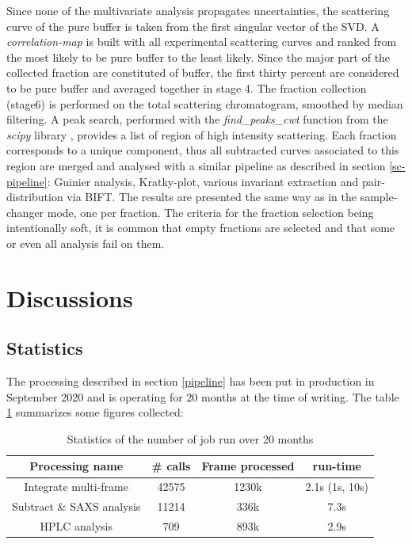 \documentclass[preprint]{iucr}              %
\begin{document}
Since none of the multivariate analysis propagates uncertainties, the scattering curve of the pure buffer is taken from the first singular vector of the SVD.
A \textit{correlation-map} is built with all experimental scattering curves and ranked from the most likely to be pure buffer to the least likely. 
Since the major part of the collected fraction are constituted of buffer, the first thirty percent are considered to be pure buffer and averaged together in stage 4.
The fraction collection (stage6) is performed on the total scattering chromatogram, smoothed by median filtering. 
A peak search, performed with the \textit{find\_peaks\_cwt} function from the \textit{scipy} library \cite{scipy}, provides a list of region of high intensity scattering.
Each fraction corresponds to a unique component, thus all subtracted curves associated to this region are merged and analysed with a similar pipeline as described in section \ref{sc-pipeline}: Guinier analysis, Kratky-plot, various invariant extraction and pair-distribution via BIFT.
The results are presented the same way as in the sample-changer mode, one per fraction.
The criteria for the fraction selection being intentionally soft, it is common that empty fractions are selected and that some or even all analysis fail on them. 

\section{Discussions}

\subsection{Statistics}
The processing described in section \ref{pipeline} has been put in production in September 2020 and is operating for 20 months at the time of writing.
The table \ref{stats} summarizes some figures collected:
\begin{table}
    \begin{tabular}{|c|c|c|c|}
        \hline
        Processing name & # calls & Frame processed & run-time \\
        \hline
        Integrate multi-frame & 42575 & 1230k & 2.1s (1s, 10s) \\
        Subtract \& SAXS analysis & 11214 & 336k & 7.3s \\
        HPLC analysis & 709 & 893k & 2.9s \\
        \hline
    \end{tabular}
    \\
    \caption{Statistics of the number of job run over 20 months}
    \label{stats}
\end{table}
\end{document}
